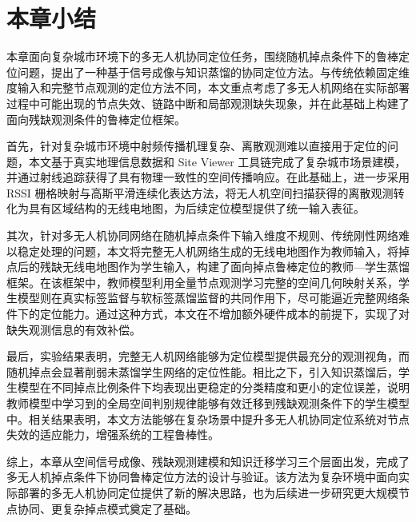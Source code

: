 \section{本章小结}
\label{sec:4_6}

本章面向复杂城市环境下的多无人机协同定位任务，围绕随机掉点条件下的鲁棒定位问题，提出了一种基于信号成像与知识蒸馏的协同定位方法。与传统依赖固定维度输入和完整节点观测的定位方法不同，本文重点考虑了多无人机网络在实际部署过程中可能出现的节点失效、链路中断和局部观测缺失现象，并在此基础上构建了面向残缺观测条件的鲁棒定位框架。

首先，针对复杂城市环境中射频传播机理复杂、离散观测难以直接用于定位的问题，本文基于真实地理信息数据和 Site Viewer 工具链完成了复杂城市场景建模，并通过射线追踪获得了具有物理一致性的空间传播响应。在此基础上，进一步采用 RSSI 栅格映射与高斯平滑连续化表达方法，将无人机空间扫描获得的离散观测转化为具有区域结构的无线电地图，为后续定位模型提供了统一输入表征。

其次，针对多无人机协同网络在随机掉点条件下输入维度不规则、传统刚性网络难以稳定处理的问题，本文将完整无人机网络生成的无线电地图作为教师输入，将掉点后的残缺无线电地图作为学生输入，构建了面向掉点鲁棒定位的教师—学生蒸馏框架。在该框架中，教师模型利用全量节点观测学习完整的空间几何映射关系，学生模型则在真实标签监督与软标签蒸馏监督的共同作用下，尽可能逼近完整网络条件下的定位能力。通过这种方式，本文在不增加额外硬件成本的前提下，实现了对缺失观测信息的有效补偿。

最后，实验结果表明，完整无人机网络能够为定位模型提供最充分的观测视角，而随机掉点会显著削弱未蒸馏学生网络的定位性能。相比之下，引入知识蒸馏后，学生模型在不同掉点比例条件下均表现出更稳定的分类精度和更小的定位误差，说明教师模型中学习到的全局空间判别规律能够有效迁移到残缺观测条件下的学生模型中。相关结果表明，本文方法能够在复杂场景中提升多无人机协同定位系统对节点失效的适应能力，增强系统的工程鲁棒性。

综上，本章从空间信号成像、残缺观测建模和知识迁移学习三个层面出发，完成了多无人机掉点条件下协同鲁棒定位方法的设计与验证。该方法为复杂环境中面向实际部署的多无人机协同定位提供了新的解决思路，也为后续进一步研究更大规模节点协同、更复杂掉点模式奠定了基础。
